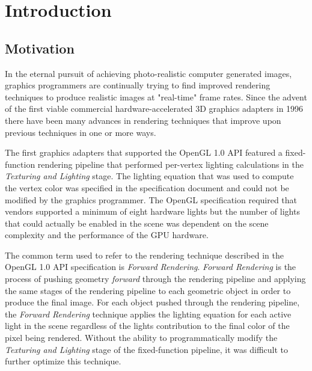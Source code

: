 
\chapter{Introduction} %
\label{ch:Introduction}


\section{Motivation}

In the eternal pursuit of achieving photo-realistic computer generated images, graphics programmers are continually trying to find improved rendering techniques to produce realistic images at "real-time" frame rates. Since the advent of the first viable commercial hardware-accelerated 3D graphics adapters in 1996 \parencite{1_singer_2013} there have been many advances in rendering techniques that improve upon previous techniques in one or more ways. 

The first graphics adapters that supported the OpenGL 1.0 API featured a fixed-function rendering pipeline that performed per-vertex lighting calculations in the \emph{Texturing and Lighting} stage. The lighting equation that was used to compute the vertex color was specified in the specification document \parencite{2_segalakeley_1994} and could not be modified by the graphics programmer. The OpenGL specification required that vendors supported a minimum of eight hardware lights but the number of lights that could actually be enabled in the scene was dependent on the scene complexity and the performance of the GPU hardware.

The common term used to refer to the rendering technique described in the OpenGL 1.0 API specification is \emph{Forward Rendering}. \emph{Forward Rendering} is the process of pushing geometry \emph{forward} through the rendering pipeline and applying the same stages of the rendering pipeline to each geometric object in order to produce the final image. For each object pushed through the rendering pipeline, the \emph{Forward Rendering} technique applies the lighting equation for each active light in the scene regardless of the lights contribution to the final color of the pixel being rendered. Without the ability to programmatically modify the \emph{Texturing and Lighting} stage of the fixed-function pipeline, it was difficult to further optimize this technique.

